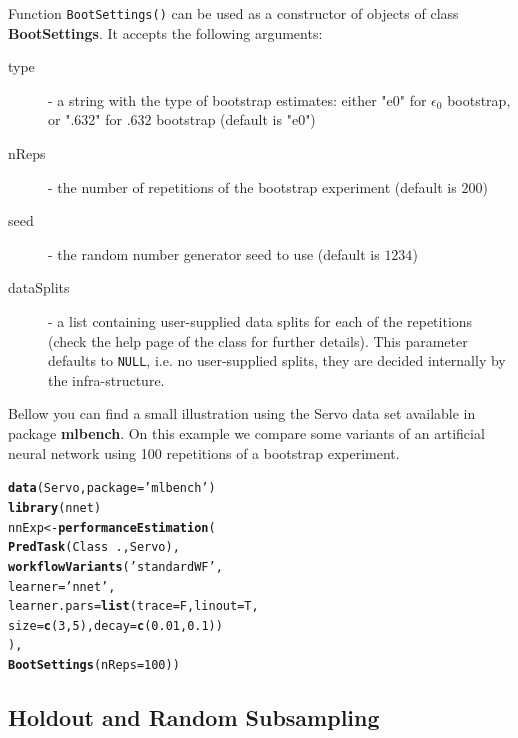 \documentclass[10pt,a4paper]{article}\usepackage[]{graphicx}\usepackage[]{color}
\makeatletter
\newcommand{\hlnum}[1]{\textcolor[rgb]{0.686,0.059,0.569}{#1}}%
\newcommand{\hlstr}[1]{\textcolor[rgb]{0.192,0.494,0.8}{#1}}%
\newcommand{\hlopt}[1]{\textcolor[rgb]{0,0,0}{#1}}%
\newcommand{\hlstd}[1]{\textcolor[rgb]{0.345,0.345,0.345}{#1}}%
\newcommand{\hlkwb}[1]{\textcolor[rgb]{0.69,0.353,0.396}{#1}}%
\newcommand{\hlkwc}[1]{\textcolor[rgb]{0.333,0.667,0.333}{#1}}%
\newcommand{\hlkwd}[1]{\textcolor[rgb]{0.737,0.353,0.396}{\textbf{#1}}}%
\newenvironment{kframe}{%
 \def\at@end@of@kframe{}%
 \ifinner\ifhmode%
  \def\at@end@of@kframe{\end{minipage}}%
  \begin{minipage}{\columnwidth}%
 \fi\fi%
 \def\FrameCommand##1{\hskip\@totalleftmargin \hskip-\fboxsep
 \colorbox{shadecolor}{##1}\hskip-\fboxsep
     \hskip-\linewidth \hskip-\@totalleftmargin \hskip\columnwidth}%
 \MakeFramed {\advance\hsize-\width
   \@totalleftmargin\z@ \linewidth\hsize
   \@setminipage}}%
 {\par\unskip\endMakeFramed%
 \at@end@of@kframe}
\newenvironment{knitrout}{}{} %
\makeatother
\begin{document}
Function \texttt{BootSettings()} can be used as a constructor of
objects of class \textbf{BootSettings}. It accepts the following
arguments:

\begin{description}
\item[type] - a string with the type of bootstrap estimates: either "e0" for $\epsilon_0$ bootstrap, or ".632" for $.632$ bootstrap (default is "e0")
\item[nReps] - the number of repetitions of the bootstrap experiment (default is $200$)
\item[seed] - the random number generator seed to use (default is $1234$)
\item[dataSplits] - a list containing user-supplied data splits
  for each of the repetitions (check the help page of the
  class for further details). This parameter defaults to
  \texttt{NULL}, i.e. no user-supplied splits, they are decided
  internally by the infra-structure.
\end{description}

Bellow you can find a small illustration using the Servo data set available in package \textbf{mlbench}. On this example we compare some variants of an artificial neural network using 100 repetitions of a bootstrap experiment. 

\begin{knitrout}
\color{fgcolor}\begin{kframe}
\begin{alltt}
\hlkwd{data}\hlstd{(Servo,}\hlkwc{package}\hlstd{=}\hlstr{'mlbench'}\hlstd{)}
\hlkwd{library}\hlstd{(nnet)}
\hlstd{nnExp} \hlkwb{<-} \hlkwd{performanceEstimation}\hlstd{(}
  \hlkwd{PredTask}\hlstd{(Class} \hlopt{~} \hlstd{.,Servo),}
  \hlkwd{workflowVariants}\hlstd{(}\hlstr{'standardWF'}\hlstd{,}
           \hlkwc{learner}\hlstd{=}\hlstr{'nnet'}\hlstd{,}
           \hlkwc{learner.pars}\hlstd{=}\hlkwd{list}\hlstd{(}\hlkwc{trace}\hlstd{=F,}\hlkwc{linout}\hlstd{=T,}
               \hlkwc{size}\hlstd{=}\hlkwd{c}\hlstd{(}\hlnum{3}\hlstd{,}\hlnum{5}\hlstd{),}\hlkwc{decay}\hlstd{=}\hlkwd{c}\hlstd{(}\hlnum{0.01}\hlstd{,}\hlnum{0.1}\hlstd{))}
          \hlstd{),}
  \hlkwd{BootSettings}\hlstd{(}\hlkwc{nReps}\hlstd{=}\hlnum{100}\hlstd{))}
\end{alltt}
\end{kframe}
\end{knitrout}


\subsection{Holdout and Random Subsampling}
\end{document}
